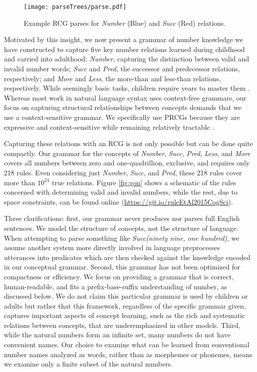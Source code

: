 \documentclass[10pt,letterpaper]{article}
\begin{document}
\begin{figure}[t]
  \begin{centering}
    \texttt{[image: parseTrees/parse.pdf]}
    \caption{Example RCG parses for \emph{Number} (Blue) and \emph{Succ} (Red) relations.}
    \label{fig:parse}
  \end{centering}
\end{figure}

Motivated by this insight, we now present a grammar of number
knowledge we have constructed to capture five key number relations
learned during childhood and carried into adulthood: \emph{Number},
capturing the distinction between valid and invalid number words;
\emph{Succ} and \emph{Pred}, the successor and predecessor relations,
respectively; and \emph{More} and \emph{Less}, the more-than and
less-than relations, respectively. While seemingly basic tasks,
children require years to master them \citep{FusRicBriar1982}. Whereas
most work in natural language syntax uses context-free grammars, our
focus on capturing structural relationships between concepts demands
that we use a context-sensitive grammar. We specifically use PRCGs
because they are expressive and context-sensitive while remaining
relatively tractable \citep{boullier2005range}.

Capturing these relations with an RCG is not only possible but can be
done quite compactly. Our grammar for the concepts of \emph{Number},
\emph{Succ}, \emph{Pred}, \emph{Less}, and \emph{More}
covers all numbers between zero and one-quadrillion, exclusive, and
requires only 218 rules. Even considering just \emph{Number},
\emph{Succ}, and \emph{Pred}, these 218 rules cover more
than $10^{24}$ true relations. Figure \ref{fig:gon} shows a schematic of
the rules concerned with determining valid and invalid numbers, while
the rest, due to space constraints, can be found online
(\url{https://git.io/ruleEtAl2015CogSci}).

Three clarifications: first, our grammar never produces nor parses
full English sentences. We model the structure of concepts, not the
structure of language. When attempting to parse something like
\emph{Succ(ninety nine, one hundred)}, we assume another system more
directly involved in language preprocesses utterances into predicates
which are then checked against the knowledge encoded in our conceptual
grammar. Second, this grammar has not been optimized for compactness
or efficiency. We focus on providing a grammar that is correct,
human-readable, and fits a prefix-base-suffix understanding of number,
as discussed below. We do not claim this particular grammar is used by
children or adults but rather that this framework, regardless of the
specific grammar given, captures important aspects of concept
learning, such as the rich and systematic relations between concepts,
that are underemphasized in other models. Third, while the natural
numbers form an infinite set, many numbers do not have convenient
names. Our choice to examine what can be learned from conventional
number names analyzed as words, rather than as morphemes or phonemes,
means we examine only a finite subset of the natural numbers.
\end{document}
